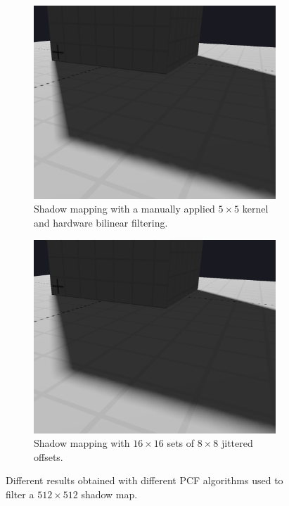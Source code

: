 \begin{figure}
    \begin{subfigure}[t]{0.45\textwidth}
        \includegraphics[width=\textwidth]{./graf/PCF_manual_kernel_5x5_bilinear.png}
        \caption{Shadow mapping with a manually applied \(5\times 5\) kernel and hardware bilinear filtering.}
        \label{fig:pcf_manual_with_bilinear}
    \end{subfigure}
    \hfill
    \begin{subfigure}[t]{0.45\textwidth}
        \includegraphics[width=\textwidth]{./graf/PCF_random_kernel_16x16_8x8.png}
        \caption{Shadow mapping with \(16\times 16\) sets of \(8\times 8\) jittered offsets.}
        \label{fig:pcf_random}
    \end{subfigure}
        
    \caption{Different results obtained with different PCF algorithms used to filter a \(512\times 512\) shadow map.}
    \label{fig:pcf_methods_example}
\end{figure}

